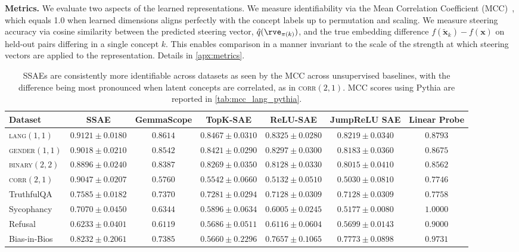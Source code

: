 \documentclass{article}
\newcommand{\x}{\mathbf{x}}
\begin{document}
\textbf{Metrics.} We evaluate two aspects of the learned representations. We measure identifiability via the Mean Correlation Coefficient (MCC)~\citep{hyvarinen2016unsupervisedfeatureextractiontimecontrastive}, which equals 1.0 when learned dimensions aligns perfectly with the concept labels up to permutation and scaling. We measure steering accuracy via cosine similarity between the predicted steering vector, $\hat{q}(\rve_{\pi(k)})$, and the true embedding difference $f(\tilde{\x}_k) - f(\x)$ on held-out pairs differing in a single concept $k$. This enables comparison in a manner invariant to the scale of the strength at which steering vectors are applied to the representation. Details in \cref{apx:metrics}. 
\begin{table}[ht]
\centering
\caption{SSAEs are consistently more identifiable across datasets as seen by the MCC across unsupervised baselines, with the difference being most pronounced when latent concepts are correlated, as in \textsc{corr}$(2,1)$. MCC scores using Pythia are reported in \cref{tab:mcc_lang_pythia}.
}
\label{tab:mcc_lang_gemma}
\small
\setlength{\tabcolsep}{6pt}
\renewcommand{\arraystretch}{1.05}
\begin{tabular}{l|c|c|c|c|c|c}
\toprule
\textbf{Dataset} 
& \textbf{SSAE} 
& \textbf{GemmaScope} 
& \textbf{TopK-SAE} 
& \textbf{ReLU-SAE} 
& \textbf{JumpReLU SAE}
& \textbf{Linear Probe} \\
\midrule
\textsc{lang}$(1,1)$     
& $0.9121 \pm 0.0180$ 
& $0.8614$ 
& $0.8467 \pm 0.0310$ 
& $0.8325 \pm 0.0280$ 
& $0.8219 \pm 0.0340$ 
& $0.8793$ \\
\hdashline
\textsc{gender}$(1,1)$   
& $0.9018 \pm 0.0210$ 
& $0.8542$ 
& $0.8421 \pm 0.0290$ 
& $0.8297 \pm 0.0300$ 
& $0.8183 \pm 0.0360$ 
& $0.8675$ \\
\hdashline
\textsc{binary}$(2,2)$   
& $0.8896 \pm 0.0240$ 
& $0.8387$ 
& $0.8269 \pm 0.0350$ 
& $0.8128 \pm 0.0330$ 
& $0.8015 \pm 0.0410$ 
& $0.8562$ \\
\hdashline
\textsc{corr}$(2,1)$     
& $0.9047 \pm 0.0207$ 
& $0.5760$ 
& $0.5542 \pm 0.0660$  
& $0.5132 \pm 0.0510$ 
& $0.5030 \pm 0.0810$ 
& $0.7746$ \\
\hdashline
TruthfulQA           
& $0.7585 \pm 0.0182$ 
& $0.7370$ 
& $0.7281 \pm 0.0294$ 
& $0.7128 \pm 0.0309$ 
& $0.7128 \pm 0.0309$ 
& $0.7758$ \\
\hdashline
Sycophancy                
& $0.7070 \pm 0.0450$ 
& $0.6344$ 
& $0.5896 \pm 0.0634$ 
& $0.6005 \pm 0.0245$ 
& $0.5177 \pm 0.0080$ 
& $1.0000$ \\
\hdashline
Refusal                  
& $0.6233 \pm 0.0401$ 
& $0.6119$ 
& $0.5686 \pm 0.0511$ 
& $0.6116 \pm 0.0604$ 
& $0.5699 \pm 0.0143$ 
& $0.9000$ \\
\hdashline
Bias-in-Bios              
& $0.8232 \pm 0.2061$ 
& $0.7385$  
& $0.5660 \pm 0.2296$ 
& $0.7657 \pm 0.1065$ 
& $0.7773 \pm 0.0898$ 
& $0.9731$ \\
\bottomrule
\end{tabular}
\end{table}
\end{document}
